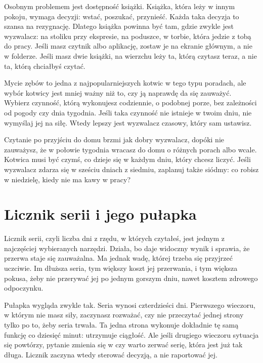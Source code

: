 Osobnym problemem jest dostępność książki. Książka, która leży w innym pokoju, wymaga decyzji: wstać, poszukać, przynieść. Każda taka decyzja to szansa na rezygnację. Dlatego książka powinna być tam, gdzie zwykle jest wyzwalacz: na stoliku przy ekspresie, na poduszce, w torbie, która jedzie z tobą do pracy. Jeśli masz czytnik albo aplikację, zostaw je na ekranie głównym, a nie w folderze. Jeśli masz dwie książki, na wierzchu leży ta, którą czytasz teraz, a nie ta, którą chciałbyś czytać.

Mycie zębów to jedna z najpopularniejszych kotwic w tego typu poradach, ale wybór kotwicy jest mniej ważny niż to, czy ją naprawdę da się zauważyć. Wybierz czynność, którą wykonujesz codziennie, o podobnej porze, bez zależności od pogody czy dnia tygodnia. Jeśli taka czynność nie istnieje w twoim dniu, nie wymyślaj jej na siłę. Wtedy lepszy jest wyzwalacz czasowy, który sam ustawisz.

\begin{falle}
  Czytanie \glqq po przyjściu do domu\grqq{} brzmi jak dobry wyzwalacz, dopóki nie zauważysz, że w połowie tygodnia wracasz do domu o różnych porach albo wcale. Kotwica musi być czymś, co dzieje się w każdym dniu, który chcesz liczyć. Jeśli wyzwalacz zdarza się w sześciu dniach z siedmiu, zaplanuj także siódmy: co robisz w niedzielę, kiedy nie ma kawy w pracy?
\end{falle}

\section{Licznik serii i jego pułapka}

Licznik serii, czyli liczba dni z rzędu, w których czytałeś, jest jednym z najczęściej wybieranych narzędzi. Działa, bo daje widoczny wynik i sprawia, że przerwa staje się zauważalna. Ma jednak wadę, której trzeba się przyjrzeć uczciwie. Im dłuższa seria, tym większy koszt jej przerwania, i tym większa pokusa, żeby nie przerywać jej po jednym gorszym dniu, nawet kosztem zdrowego odpoczynku.

Pułapka wygląda zwykle tak. Seria wynosi czterdzieści dni. Pierwszego wieczoru, w którym nie masz siły, zaczynasz rozważać, czy nie przeczytać jednej strony tylko po to, żeby seria trwała. Ta jedna strona wykonuje dokładnie tę samą funkcję co dziesięć minut: utrzymuje ciągłość. Ale jeśli drugiego wieczoru sytuacja się powtórzy, pytanie zmienia się w \glqq czy warto zerwać serię, która jest już tak długa\grqq{}. Licznik zaczyna wtedy sterować decyzją, a nie raportować jej.

